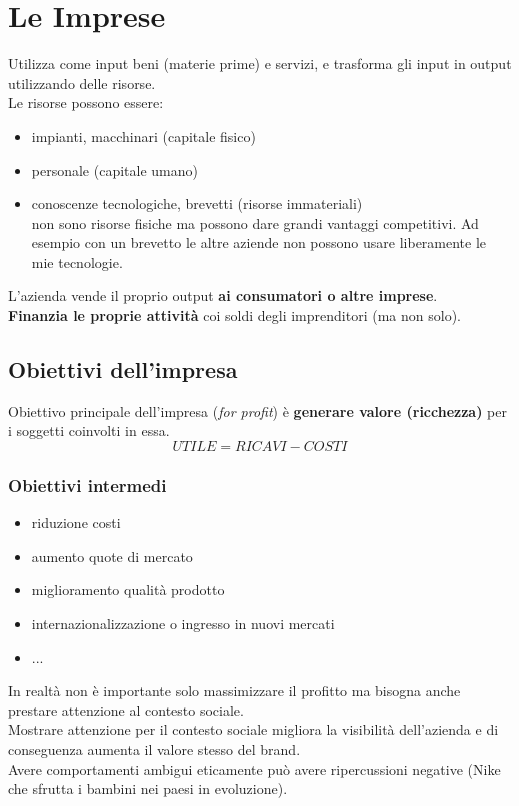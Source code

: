 \documentclass[12pt, letterpaper]{article}
\begin{document}
	\section{Le Imprese}
	
		Utilizza come input beni (materie prime) e servizi, e trasforma gli input in output utilizzando delle risorse.\\
		Le risorse possono essere:
			
			\begin{itemize}
				\item impianti, macchinari (capitale fisico)
				\item personale (capitale umano)
				\item conoscenze tecnologiche, brevetti (risorse immateriali)\\
					non sono risorse fisiche ma possono dare grandi vantaggi competitivi. Ad esempio con un brevetto le altre aziende non possono usare liberamente le mie tecnologie.
			\end{itemize}
	
		L'azienda vende il proprio output \textbf{ai consumatori o altre imprese}.\\
		\textbf{Finanzia le proprie attività} coi soldi degli imprenditori (ma non solo).
		
		
	\subsection{Obiettivi dell'impresa}
	
		Obiettivo principale dell'impresa (\emph{for profit}) è \textbf{generare valore (ricchezza)} per i soggetti coinvolti in essa.
		$$ UTILE = RICAVI - COSTI $$
		
		\subsubsection{Obiettivi intermedi}
		
			\begin{itemize}
				\item riduzione costi
				\item aumento quote di mercato
				\item miglioramento qualità prodotto
				\item internazionalizzazione o ingresso in nuovi mercati
				\item ...
			\end{itemize}
		
		In realtà non è importante solo massimizzare il profitto ma bisogna anche prestare attenzione al contesto sociale.\\
		Mostrare attenzione per il contesto sociale migliora la visibilità dell'azienda e di conseguenza aumenta il valore stesso del brand.\\
		Avere comportamenti ambigui eticamente può avere ripercussioni negative (Nike che sfrutta i bambini nei paesi in evoluzione).
		
		
		
		
		
		
		
		
		
		
		
		
		
	
\end{document}

